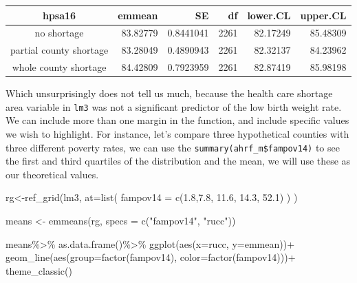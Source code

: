 \documentclass[
  letterpaper,
  DIV=11,
  numbers=noendperiod]{scrreprt}
\newenvironment{Shaded}{\begin{snugshade}}{\end{snugshade}}
\newcommand{\AttributeTok}[1]{\textcolor[rgb]{0.40,0.45,0.13}{#1}}
\newcommand{\FloatTok}[1]{\textcolor[rgb]{0.68,0.00,0.00}{#1}}
\newcommand{\FunctionTok}[1]{\textcolor[rgb]{0.28,0.35,0.67}{#1}}
\newcommand{\NormalTok}[1]{\textcolor[rgb]{0.00,0.23,0.31}{#1}}
\newcommand{\OtherTok}[1]{\textcolor[rgb]{0.00,0.23,0.31}{#1}}
\newcommand{\SpecialCharTok}[1]{\textcolor[rgb]{0.37,0.37,0.37}{#1}}
\newcommand{\StringTok}[1]{\textcolor[rgb]{0.13,0.47,0.30}{#1}}
\begin{document}
\begin{longtable*}{crrrrr}
\toprule
hpsa16 & emmean & SE & df & lower.CL & upper.CL \\ 
\midrule
no shortage & 83.82779 & 0.8441041 & 2261 & 82.17249 & 85.48309 \\ 
partial county shortage & 83.28049 & 0.4890943 & 2261 & 82.32137 & 84.23962 \\ 
whole county shortage & 84.42809 & 0.7923959 & 2261 & 82.87419 & 85.98198 \\ 
\bottomrule
\end{longtable*}

Which unsurprisingly does not tell us much, because the health care
shortage area variable in \texttt{lm3} was not a significant predictor
of the low birth weight rate. We can include more than one margin in the
function, and include specific values we wish to highlight. For
instance, let's compare three hypothetical counties with three different
poverty rates, we can use the \texttt{summary(ahrf\_m\$fampov14)} to see
the first and third quartiles of the distribution and the mean, we will
use these as our theoretical values.

\begin{Shaded}
\begin{Highlighting}[]
\NormalTok{rg}\OtherTok{\textless{}{-}}\FunctionTok{ref\_grid}\NormalTok{(lm3,}
             \AttributeTok{at=}\FunctionTok{list}\NormalTok{( }\AttributeTok{fampov14 =} \FunctionTok{c}\NormalTok{(}\FloatTok{1.8}\NormalTok{,}\FloatTok{7.8}\NormalTok{, }\FloatTok{11.6}\NormalTok{, }\FloatTok{14.3}\NormalTok{, }\FloatTok{52.1}\NormalTok{) ) )}

\NormalTok{means }\OtherTok{\textless{}{-}} \FunctionTok{emmeans}\NormalTok{(rg, }\AttributeTok{specs =} \FunctionTok{c}\NormalTok{(}\StringTok{"fampov14"}\NormalTok{, }\StringTok{"rucc"}\NormalTok{))}

\NormalTok{means}\SpecialCharTok{\%\textgreater{}\%}
  \FunctionTok{as.data.frame}\NormalTok{()}\SpecialCharTok{\%\textgreater{}\%}
  \FunctionTok{ggplot}\NormalTok{(}\FunctionTok{aes}\NormalTok{(}\AttributeTok{x=}\NormalTok{rucc, }\AttributeTok{y=}\NormalTok{emmean))}\SpecialCharTok{+}
  \FunctionTok{geom\_line}\NormalTok{(}\FunctionTok{aes}\NormalTok{(}\AttributeTok{group=}\FunctionTok{factor}\NormalTok{(fampov14), }\AttributeTok{color=}\FunctionTok{factor}\NormalTok{(fampov14)))}\SpecialCharTok{+}
  \FunctionTok{theme\_classic}\NormalTok{()}
\end{Highlighting}
\end{Shaded}
\end{document}
